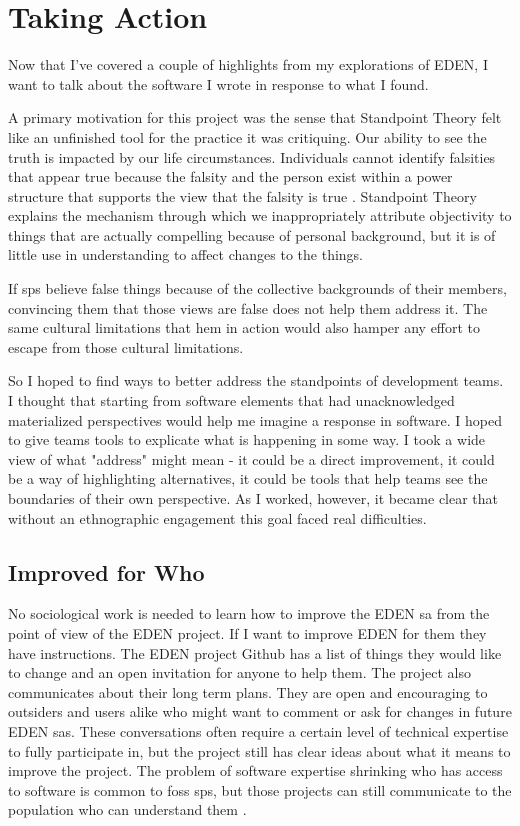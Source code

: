 \documentclass[a4paper,man,natbib,floatsintext]{apa6}
\begin{document}
  \section{Taking Action}
  Now that I've covered a couple of highlights from my explorations of \gls{EDEN}, I want to talk about the software I wrote in response to what I found.  

  A primary motivation for this project was the sense that Standpoint Theory felt like an unfinished tool for the practice it was critiquing. Our ability to see the truth is impacted by our life circumstances. Individuals cannot identify falsities that appear true because the falsity and the person exist within a power structure that supports the view that the falsity is true \citep{Haraway1988-nh}. Standpoint Theory explains the mechanism through which we inappropriately attribute objectivity to things that are actually compelling because of personal background, but it is of little use in understanding to affect changes to the things. 

  If \glspl{sp} believe false things because of the collective backgrounds of their members, convincing them that those views are false does not help them address it. The same cultural limitations that hem in action would also hamper any effort to escape from those cultural limitations.

  So I hoped to find ways to better address the standpoints of development teams. I thought that starting from software elements that had unacknowledged materialized perspectives would help me imagine a response in software. I hoped to give teams tools to explicate what is happening in some way. I took a wide view of what "address" might mean - it could be a direct improvement, it could be a way of highlighting alternatives, it could be tools that help teams see the boundaries of their own perspective. As I worked, however, it became clear that without an ethnographic engagement this goal faced real difficulties.

  \subsection{Improved for Who}
  No sociological work is needed to learn how to improve the \gls{EDEN} \gls{sa} from the point of view of the \gls{EDEN} project. If I want to improve \gls{EDEN} for them they have instructions. The \gls{EDEN} project Github has a list of things they would like to change and an open invitation for anyone to help them. The project also communicates about their long term plans. They are open and encouraging to outsiders and users alike who might want to comment or ask for changes in future \gls{EDEN} \glspl{sa}. These conversations often require a certain level of technical expertise to fully participate in, but the project still has clear ideas about what it means to improve the project. The problem of software expertise shrinking who has access to software is common to \acrshort{foss} \glspl{sp}, but those projects can still communicate to the population who can understand them \citep{Drexler2019-tk,Kelty2008-jm}. 
\end{document}
